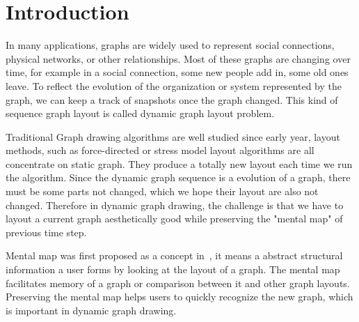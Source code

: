 \section{Introduction}
In many applications,
graphs are widely used to represent social connections, physical networks, or other relationships.
Most of these graphs are changing over time, for example in a social connection, some new people add
in, some old ones leave. To reflect the evolution of the organization or system represented by the graph, 
we can keep a track of snapshots once the graph changed. This kind of sequence graph layout is called
dynamic graph layout problem.

Traditional Graph drawing algorithms are well studied since
early year, layout methods, such as force-directed or stress model layout algorithms are
all concentrate on static graph. They produce a totally new layout each time we run the algorithm. 
Since the dynamic graph sequence is a evolution of a graph, there must be some parts not changed, which
we hope their layout are also not changed. Therefore in dynamic graph drawing, the challenge is that we have to 
layout a current graph aesthetically good while preserving the "mental map" of previous time step.

Mental map was first proposed as a concept in~\cite{Eades:1991:POC}, it means a abstract structural information
a user forms by looking at the layout of a graph. The mental map facilitates memory of a graph or comparison between
it and other graph layouts. Preserving the mental map helps users to quickly recognize the new graph, which
is important in dynamic graph drawing.  


